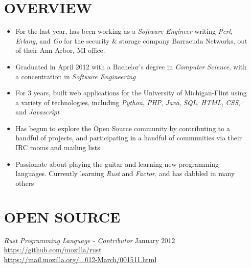\documentclass[line,margin]{res}
\begin{document}

\address{1450 Schafer Drive, Burton, MI 48509}
\address{pwoolcoc@gmail.com\ -\ (810) 412-8642}


\begin{resume}


\section{OVERVIEW}
    \begin{itemize}
        \item For the last year, has been working as a {\sl Software Engineer}
              writing {\sl Perl}, {\sl Erlang}, and {\sl Go} for the security \& storage company
              Barracuda Networks, out of their Ann Arbor, MI office.
        \item Graduated in April 2012 with a Bachelor's degree in
              {\sl Computer Science}, with a concentration in
              {\sl Software Engineering}
        \item For 3 years, built web applications
              for the University of Michigan-Flint using a variety of
              technologies, including {\sl Python}, {\sl PHP}, {\sl Java},
              {\sl SQL}, {\sl HTML}, {\sl CSS}, and {\sl Javascript}
        \item Has begun to explore the Open Source community by contributing to
              a handful of projects, and participating in a handful
              of communities via their IRC rooms and mailing lists
        \item Passionate about playing the guitar and learning new programming
              languages. Currently learning {\sl Rust} and {\sl Factor},
              and has dabbled in many others
    \end{itemize}



\section{OPEN SOURCE}
        {\sl Rust Programming Language - Contributor } \hfill January 2012 \\
              \href{https://github.com/mozilla/rust}{https://github.com/mozilla/rust} \\
              \href{https://mail.mozilla.org/pipermail/rust-dev/2012-March/001511.html}{https://mail.mozilla.org/...012-March/001511.html}


\end{resume}
\end{document}
